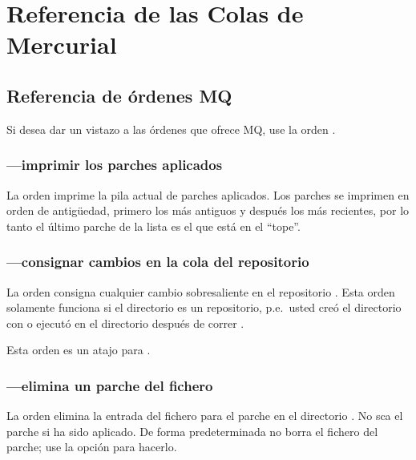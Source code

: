 \chapter{Referencia de las Colas de Mercurial}
\label{chap:mqref}

\section{Referencia de órdenes MQ}
\label{sec:mqref:cmdref}

Si desea dar un vistazo a las órdenes que ofrece MQ, use la orden
.

\subsection{---imprimir los parches aplicados}

La orden  imprime la pila actual de parches
aplicados.  Los parches se imprimen en orden de antigüedad, primero
los más antiguos y después los más recientes, por lo tanto el último
parche de la lista es el que está en el ``tope''.

\subsection{---consignar cambios en la cola del repositorio}

La orden  consigna cualquier cambio sobresaliente
en el repositorio .  Esta orden solamente
funciona si el directorio  es un repositorio,
p.e.~usted creó el directorio con
 o ejecutó
 en el directorio después de correr .

Esta orden es un atajo para .

\subsection{---elimina un parche del fichero
  }

La orden  elimina la entrada del fichero
 para el parche en el directorio
.  No sca el parche si ha sido aplicado.  De
forma predeterminada no borra el fichero del parche; use la opción
 para hacerlo.

